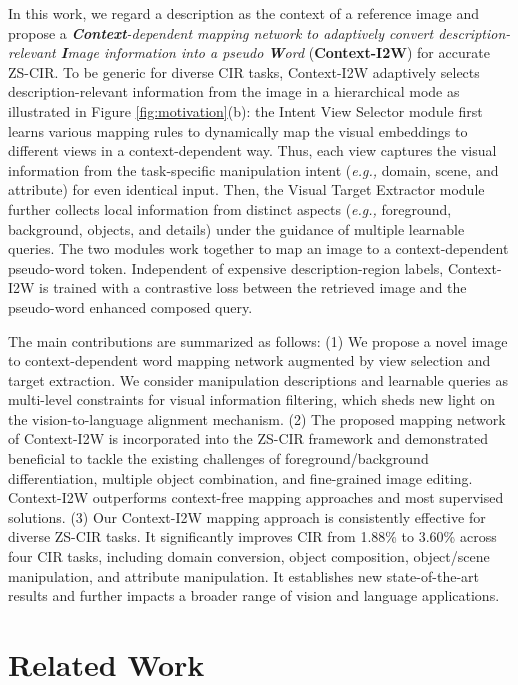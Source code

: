 \documentclass[letterpaper]{article} \usepackage{aaai24}  \usepackage{times}  \usepackage{helvet}  \usepackage{courier}  \usepackage[hyphens]{url}  \usepackage{graphicx} \urlstyle{rm} \def\UrlFont{\rm}  \usepackage{natbib}  \usepackage{caption} \frenchspacing  \setlength{\pdfpagewidth}{8.5in} \setlength{\pdfpageheight}{11in} \usepackage{algorithm}
\begin{document}
In this work, we regard a description as the context of a reference image and propose a \textit{\textbf{Context}-dependent mapping network to adaptively convert description-relevant \textbf{I}mage information into a pseudo \textbf{W}ord} (\textbf{Context-I2W}) for accurate ZS-CIR. To be generic for diverse CIR tasks, Context-I2W adaptively selects description-relevant information from the image in a hierarchical mode as illustrated in Figure \ref{fig:motivation}(b): the Intent View Selector module first learns various mapping rules to dynamically map the visual embeddings to different views in a context-dependent way. Thus, each view captures the visual information from the task-specific manipulation intent (\textit{e.g.,} domain, scene, and attribute) for even identical input. Then, the Visual Target Extractor module further collects local information from distinct aspects (\textit{e.g.,} foreground, background, objects, and details) under the guidance of multiple learnable queries. The two modules work together to map an image to a context-dependent pseudo-word token. Independent of expensive description-region labels, Context-I2W is trained with a contrastive loss between the retrieved image and the pseudo-word enhanced composed query. 

The main contributions are summarized as follows: (1) We propose a novel image to context-dependent word mapping network augmented by view selection and target extraction. We consider manipulation descriptions and learnable queries as multi-level constraints for visual information filtering, which sheds new light on the vision-to-language alignment mechanism. (2) The proposed mapping network of Context-I2W is incorporated into the ZS-CIR framework and demonstrated beneficial to tackle the existing challenges of foreground/background differentiation, multiple object combination, and fine-grained image editing. Context-I2W outperforms context-free mapping approaches and most supervised solutions. (3) Our Context-I2W mapping approach is consistently effective for diverse ZS-CIR tasks. It significantly improves CIR from 1.88\% to 3.60\% across four CIR tasks, including domain conversion, object composition, object/scene manipulation, and attribute manipulation. It establishes new state-of-the-art results and further impacts a broader range of vision and language applications.

\section{Related Work}
\end{document}
